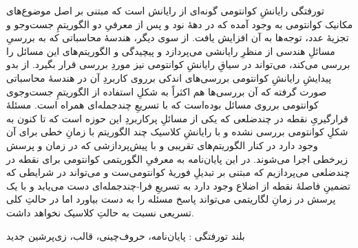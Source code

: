 


\pagestyle{empty}

‌تورفتگی
رایانشِ کوانتومی گونه‌ای از رایانش است که مبتنی بر اصل موضوع‌های مکانیک کوانتومی به وجود آمده 
که در دههٔ نود و پس از معرفیِ دو الگوریتمِ جست‌وجو و تجزیهٔ عدد، توجه‌ها به آن افزایش یافت.
از سوی دیگر، هندسهٔ محاسباتی که به بررسیِ مسائلِ هندسی از منظرِ رایانشی می‌پردازد و پیچیدگی و 
الگوریتم‌های این مسائل را بررسی می‌کند، می‌تواند در سیاقِ رایانشِ کوانتومی نیز موردِ بررسی قرار 
بگیرد. از بدو پیدایشِ رایانشِ کوانتومی بررسی‌های اندکی برروی کاربردِ آن در هندسهٔ محاسباتی صورت
گرفته که آن بررسی‌ها هم اکثراً به شکلِ استفاده از الگوریتمِ جست‌وجوی کوانتومی برروی مسائل بوده‌است
که با تسریعِ چندجمله‌ای همراه است. مسئلهٔ قرارگیریِ نقطه در چندضلعی که یکی از مسائلِ پرکاربردِ این حوزه
است که تا کنون به شکلِ کوانتومی بررسی نشده و با رایانشِ کلاسیک چند الگوریتم با زمانِ خطی برای آن
وجود دارد در کنار الگوریتم‌های تقریبی و با پیش‌پردازشی که در زمان و پرسش زیرخطی اجرا می‌شوند.
در این پایان‌نامه به معرفیِ الگوریتمی کوانتومی برای نقطه در چندضلعی می‌پردازیم که مبتنی بر تبدیلِ
فوریهٔ کوانتومی‌ست و می‌تواند در  شرایطی که تضمینِ فاصلهٔ نقطه از اضلاع وجود دارد به تسریعِ
فرا-چندجمله‌ای دست می‌یابد و با یک پرسش در زمانِ لگاریتمی می‌تواند پاسخ مسئله را به دست بیاورد
اما در حالتِ کلی تسریعی نسبت به حالتِ کلاسیک نخواهد داشت.

‌بلند
‌تورفتگی : 
پایان‌نامه، حروف‌چینی، قالب، زی‌پرشین
‌جدید
